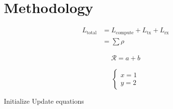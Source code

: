 \section{Methodology}
\begin{equation}
\label{eq:total_latency}
\begin{aligned}
L_{\text{total}} &= L_{\text{compute}} + L_{\text{tx}} + L_{\text{rx}} \\
&= \sum \rho
\end{aligned}
\end{equation}

\begin{equation}
\label{eq:reward}
\begin{split}
\mathcal{R} = a + b
\end{split}
\end{equation}

\begin{equation}
\label{eq:fedavg}
\begin{cases}
x = 1 \\
y = 2
\end{cases}
\end{equation}

\begin{algorithm}
\caption{D3QN}
\begin{algorithmic}
\State Initialize
\State Update equations
\EndFor
\end{algorithmic}
\end{algorithm}
